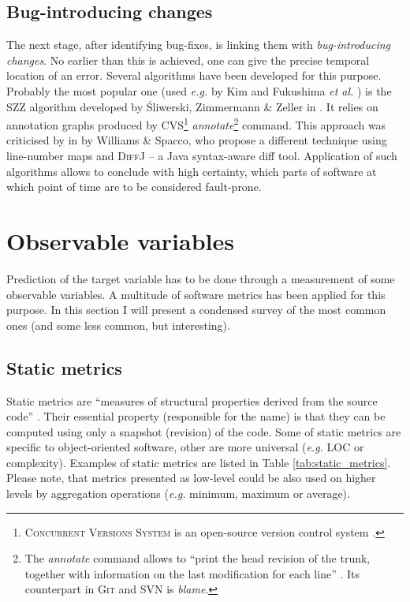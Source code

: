 \documentclass{pracamgr}
\begin{document}
\subsection{Bug-introducing changes}
\label{sec:bug-introducing}
The next stage, after identifying bug-fixes, is linking them with \emph{bug-introducing changes}. No earlier than this is achieved, one can give the precise temporal location of an error. Several algorithms have been developed for this purpose. Probably the most popular one (used \textit{e.g.} by Kim \cite{adaptive} and Fukushima \textit{et al.} \cite{Fukushima}) is the SZZ algorithm developed by Śliwerski, Zimmermann \& Zeller in \cite{SZZ}. It relies on annotation graphs produced by CVS\footnote{\textsc{Concurrent Versions System} is an open-source version control system \cite{CVS}.} \emph{annotate}\footnote{The \emph{annotate} command allows to ``print the head revision of the trunk, together with information on the last modification for each line'' \cite{CVS_annotate}. Its counterpart in \textsc{Git} and SVN is \emph{blame}.} command. This approach was criticised by in \cite{SZZ_revisited} by Williams \& Spacco, who propose a different technique using line-number maps and \textsc{DiffJ} -- a Java syntax-aware diff tool. Application of such algorithms allows to conclude with high certainty, which parts of software at which point of time are to be considered fault-prone.

\section{Observable variables}
\label{sec:observable_variables}
Prediction of the target variable has to be done through a measurement of some observable variables. A multitude of software metrics has been applied for this purpose. In this section I will present a condensed survey of the most common ones (and some less common, but interesting).

\subsection{Static metrics}
\label{sec:static}
Static metrics are ``measures of structural properties derived from the source code'' \cite[p.~5]{systematic}. Their essential property (responsible for the name) is that they can be computed using only a snapshot (revision) of the code. Some of static metrics are specific to object-oriented software, other are more universal (\textit{e.g.} LOC or complexity). Examples of static metrics are listed in Table \ref{tab:static_metrics}. Please note, that metrics presented as low-level could be also used on higher levels by aggregation operations (\textit{e.g.} minimum, maximum or average).
\end{document}
